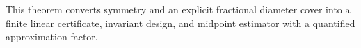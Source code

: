 This theorem converts symmetry and an explicit fractional diameter cover into a finite linear certificate, invariant design, and midpoint estimator with a quantified approximation factor.